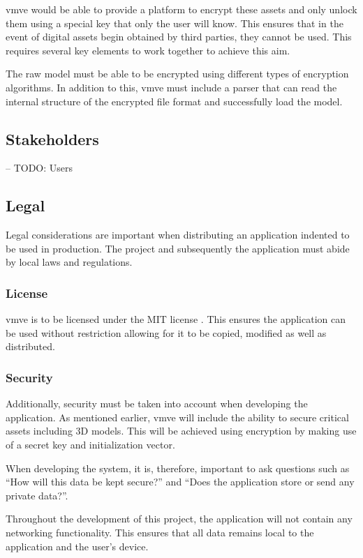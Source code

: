 \documentclass[11pt]{article}
\begin{document}
\gls{vmve} would be able to provide a platform to encrypt these assets and only
unlock them using a special key that only the user will know. This ensures that
in the event of digital assets begin obtained by third parties, they cannot be
used. This requires several key elements to work together to achieve this aim.

The raw model must be able to be encrypted using different types of encryption
algorithms. In addition to this, \gls{vmve} must include a parser that can read
the internal structure of the encrypted file format and successfully load the
model.

\subsection{Stakeholders}
-- TODO: Users



\subsection{Legal}
Legal considerations are important when distributing an application indented to
be used in production. The project and subsequently the application must abide by
local laws and regulations.

\subsubsection{License}
\gls{vmve} is to be licensed under the MIT license \cite{mit}. This ensures the
application can be used without restriction allowing for it to be copied,
modified as well as distributed.

\subsubsection{Security}
Additionally, security must be taken into account when developing the
application. As mentioned earlier, \gls{vmve} will include the ability to secure
critical assets including 3D models. This will be achieved using encryption by
making use of a secret key and initialization vector.

When developing the system, it is, therefore, important to ask questions such as
``How will this data be kept secure?'' and ``Does the application store or send
any private data?''. 

Throughout the development of this project, the application will not contain any
networking functionality. This ensures that all data remains local to the
application and the user's device.
\end{document}
